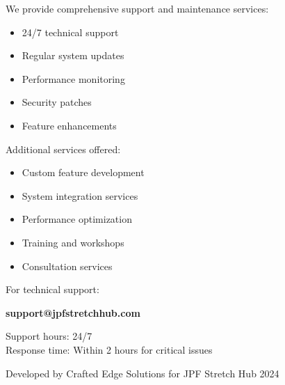 \begin{tcolorbox}[
    enhanced,
    title={Support \& Services},
    attach boxed title to top left,
    boxed title style={
        colback=success!50,
        colframe=success!50,
        arc=0mm,
    },
    colback=white,
    colframe=success!50,
    arc=0mm,
    fonttitle=\bfseries
]
    We provide comprehensive support and maintenance services:
    \begin{itemize}[nosep]
        \item 24/7 technical support
        \item Regular system updates
        \item Performance monitoring
        \item Security patches
        \item Feature enhancements
    \end{itemize}
    
    \vspace{0.3cm}
    Additional services offered:
    \begin{itemize}[nosep]
        \item Custom feature development
        \item System integration services
        \item Performance optimization
        \item Training and workshops
        \item Consultation services
    \end{itemize}
    
    \vspace{0.3cm}
    For technical support:
    \begin{center}
        \textbf{support@jpfstretchhub.com}
    \end{center}
    
    \vspace{0.2cm}
    Support hours: 24/7\\
    Response time: Within 2 hours for critical issues
\end{tcolorbox}

\begin{flushright}
    \small{Developed by Crafted Edge Solutions for JPF Stretch Hub \textcopyright{} 2024}
\end{flushright}
